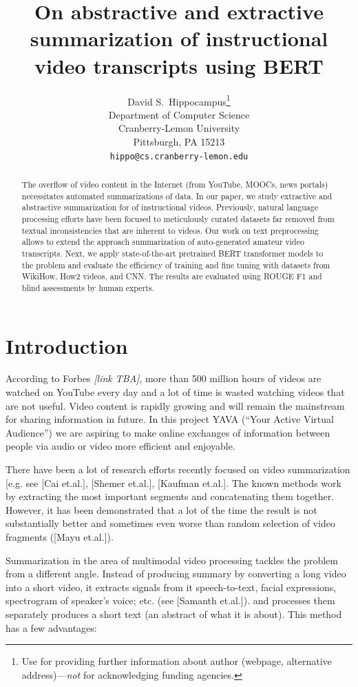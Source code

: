 \documentclass{article}
\title{On abstractive and extractive summarization of instructional video transcripts using BERT}
\author{%
  David S.~Hippocampus\thanks{Use  for providing further information
    about author (webpage, alternative address)---\emph{not} for acknowledging
    funding agencies.} \\
  Department of Computer Science\\
  Cranberry-Lemon University\\
  Pittsburgh, PA 15213 \\
  \texttt{hippo@cs.cranberry-lemon.edu} \\
}
\begin{document}
\maketitle

\begin{abstract}
The overflow of video content in the Internet (from YouTube, MOOCs, news portals) necessitates automated summarizations of data. In our paper, we study extractive and abstractive summarization for of instructional videos. Previously, natural language processing efforts have been focused to meticulously curated datasets far removed from textual inconsistencies that are inherent to videos. Our work on text preprocessing allows to extend the approach summarization of auto-generated amateur video transcripts. Next, we apply state-of-the-art pretrained BERT transformer models to the problem and evaluate the efficiency of  training and fine tuning with datasets from WikiHow, How2 videos, and CNN. The results are evaluated using ROUGE F1 and blind assessments by human experts.

\end{abstract}

\section{Introduction}
 

According to Forbes \textit{[link TBA]}, more than 500 million hours of videos are watched on YouTube every day and a lot of time is wasted watching videos that are not useful. Video content is rapidly growing and will remain the mainstream for sharing information in future. In this project YAVA (“Your Active Virtual Audience”) we are aspiring to make online exchanges of information between people via audio or video more efficient and enjoyable. 

There have been a lot of research efforts recently focused on video summarization [e.g. see [Cai et.al.], [Shemer et.al.], [Kaufman et.al.]. The known methods work by extracting the most important segments and concatenating them together. However, it has been demonstrated that a lot of the time the result is not substantially better and sometimes even worse than random selection of video fragments ([Mayu et.al.]). 

Summarization in the area of multimodal video processing tackles the problem from a different angle. Instead of producing summary by converting a long video into a short video, it extracts signals from it speech-to-text, facial expressions, spectrogram of speaker’s voice; etc. (see [Samanth et.al.]). and processes them separately produces a short text (an abstract of what it is about). This method has a few advantages:
\end{document}
